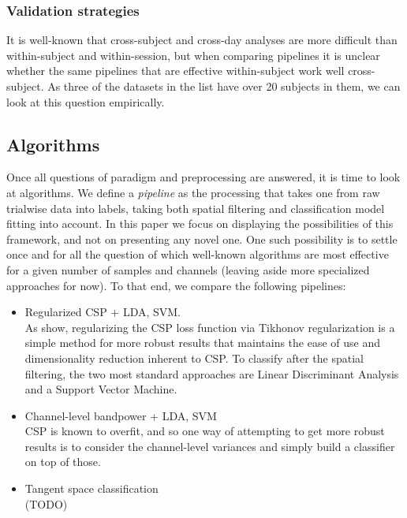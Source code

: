 \subsubsection{Validation strategies}
It is well-known that cross-subject and cross-day analyses are more difficult
than within-subject and within-session, but when comparing pipelines it is
unclear whether the same pipelines that are effective within-subject work well
cross-subject. As three of the datasets in the list have over 20 subjects in
them, we can look at this question empirically.


\subsection{Algorithms}

Once all questions of paradigm and preprocessing are answered, it is time to
look at algorithms. We define a \emph{pipeline} as the processing that takes one
from raw trialwise data into labels, taking both spatial filtering and
classification model fitting into account.  In this paper we focus on displaying
the possibilities of this framework, and not on presenting any novel one. One
such possibility is to settle once and for all the question of which well-known
algorithms are most effective for a given number of samples and channels
(leaving aside more specialized approaches for now). To that end, we compare the
following pipelines:

\begin{itemize}
\item Regularized CSP  + LDA, SVM. \\
  As \cite{Lotte2011} show, regularizing the CSP loss function via Tikhonov
  regularization is a simple method for more robust results that maintains the
  ease of use and dimensionality reduction inherent to CSP. To classify after
  the spatial filtering, the two most standard approaches are Linear
  Discriminant Analysis and a Support Vector Machine.
\item Channel-level bandpower + LDA, SVM \\
  CSP is known to overfit, and so one way of attempting to get more robust results is to consider the channel-level variances and simply build a classifier on top of those. 
\item Tangent space classification\\
  (TODO)
\end{itemize}

